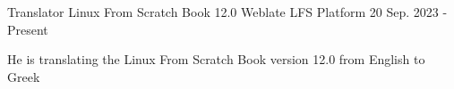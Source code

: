

\begin{cventries}

  \cventry
    {Translator} %
    {Linux From Scratch Book 12.0} %
    {Weblate LFS Platform} %
    {20 Sep. 2023 - Present} %
    {
      \begin{cvitems} %
        \item {He is translating the Linux From Scratch Book version 12.0 from English to Greek}
      \end{cvitems}
    }

\end{cventries}
